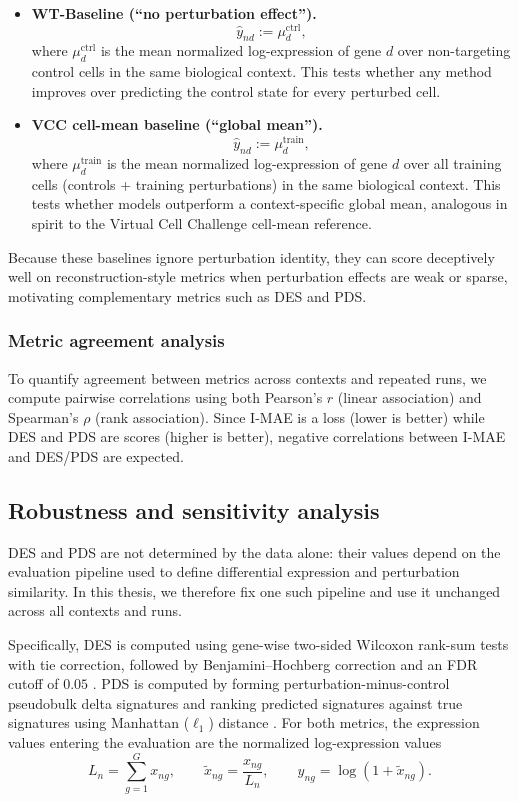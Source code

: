 \documentclass[12pt]{article}
\begin{document}
\begin{itemize}
  \item \textbf{WT-Baseline (``no perturbation effect'').}
  \[
    \hat{y}_{nd} := \mu^{\mathrm{ctrl}}_{d},
  \]
  where \(\mu^{\mathrm{ctrl}}_{d}\) is the mean normalized log-expression of gene \(d\) over non-targeting control cells
  in the same biological context.
  This tests whether any method improves over predicting the control state for every perturbed cell.

  \item \textbf{VCC cell-mean baseline (``global mean'').}
  \[
    \hat{y}_{nd} := \mu^{\mathrm{train}}_{d},
  \]
  where \(\mu^{\mathrm{train}}_{d}\) is the mean normalized log-expression of gene \(d\) over all training cells
  (controls + training perturbations) in the same biological context.
  This tests whether models outperform a context-specific global mean, analogous in spirit to the Virtual Cell Challenge
  cell-mean reference.
\end{itemize}

Because these baselines ignore perturbation identity, they can score deceptively well on reconstruction-style metrics when
perturbation effects are weak or sparse, motivating complementary metrics such as DES and PDS.

\subsubsection{Metric agreement analysis}
To quantify agreement between metrics across contexts and repeated runs, we compute pairwise correlations using both Pearson's \(r\) (linear association) and Spearman's \(\rho\) (rank association). Since I-MAE is a loss (lower is better) while DES and PDS are scores (higher is better), negative correlations between I-MAE and DES/PDS are expected.

\subsection{Robustness and sensitivity analysis}\label{robustness}
DES and PDS are not determined by the data alone: their values depend on the evaluation pipeline used
to define differential expression and perturbation similarity. In this thesis, we therefore fix one such
pipeline and use it unchanged across all contexts and runs.

Specifically, DES is computed using gene-wise two-sided Wilcoxon rank-sum tests with tie correction,
followed by Benjamini--Hochberg correction and an FDR cutoff of \(0.05\)
\cite{virtualcellchallenge_eval,benjamini1995fdr}. PDS is computed by forming perturbation-minus-control
pseudobulk delta signatures and ranking predicted signatures against true signatures using Manhattan
(\(\ell_1\)) distance \cite{virtualcellchallenge_eval}. For both metrics, the expression values entering the
evaluation are the normalized log-expression values
\[
L_n=\sum_{g=1}^{G} x_{ng}, \qquad
\tilde{x}_{ng}=\frac{x_{ng}}{L_n}, \qquad
y_{ng}=\log(1+\tilde{x}_{ng}).
\]
\end{document}
